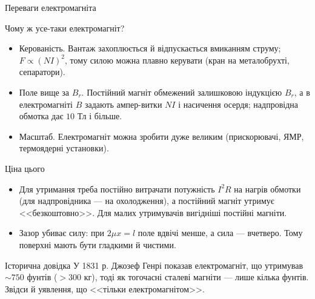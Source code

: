 \documentclass[onlytextwidth]{beamer}
\begin{document}
\begin{frame}{Переваги електромагніта}{}\small
	\begin{block}{Чому ж усе-таки електромагніт?}\justifying
		\begin{itemize}
			\item \alert{Керованість.} Вантаж захоплюється й відпускається вмиканням струму; $F \propto (NI)^2$, тому силою можна плавно
			керувати (кран на металобрухті, сепаратори).
			\item \alert{Поле вище за $B_r$.} Постійний магніт обмежений залишковою індукцією $B_r$, а в електромагніті $B$ задають ампер-витки
			$NI$ і насичення осердя; надпровідна обмотка дає $10$ Тл і більше.
			\item \alert{Масштаб.} Електромагніт можна зробити дуже великим (прискорювачі, ЯМР, термоядерні установки).
		\end{itemize}
	\end{block}
	\begin{block}{Ціна цього}\justifying
		\begin{itemize}
			\item Для утримання треба постійно витрачати потужність $I^2R$ на нагрів обмотки (для надпровідника --- на охолодження), а постійний
			магніт утримує <<безкоштовно>>. Для малих утримувачів вигідніші постійні магніти.
			\item Зазор убиває силу: при $2\mu x = l$ поле вдвічі менше, а сила --- вчетверо. Тому поверхні мають бути гладкими й чистими.
		\end{itemize}
	\end{block}
	\begin{alertblock}{Історична довідка}\justifying
		У 1831 р. Джозеф Генрі показав електромагніт, що утримував $\sim 750$ фунтів ($> 300$ кг), тоді як тогочасні сталеві магніти ---
		лише кілька фунтів. Звідси й уявлення, що <<тільки електромагнітом>>.
	\end{alertblock}
\end{frame}
\end{document}
